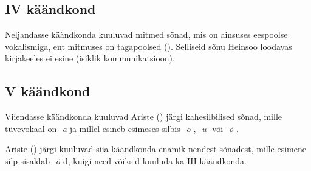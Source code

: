 \documentclass[12pt,a4paper]{article}
\newcommand{\vadja}[1]{\textit{#1}}
\begin{document}
\subsection{\RN{4} käändkond}

Neljandasse käändkonda kuuluvad mitmed sõnad, mis on ainsuses eespoolse vokalismiga, ent mitmuses on tagapoolsed (\cite[43]{ariste_grammar_1968}). Selliseid sõnu Heinsoo loodavas kirjakeeles ei esine (isiklik kommunikatsioon). %


\subsection{\RN{5} käändkond}

Viiendasse käändkonda kuuluvad Ariste (\citeyear[44]{ariste_grammar_1968}) järgi kahe\-silbilised sõnad, mille tüve\-vokaal on \vadja{-a} ja millel esineb esimeses silbis \vadja{-o-}, \vadja{-u-} või \vadja{-õ-}.

Ariste (\citeyear[44]{ariste_grammar_1968}) järgi kuuluvad siia käändkonda enamik nendest sõnadest, mille esimene silp sisaldab \textit{-õ-}d, kuigi need võiksid kuuluda ka \RN{3} käändkonda.

\end{document}
